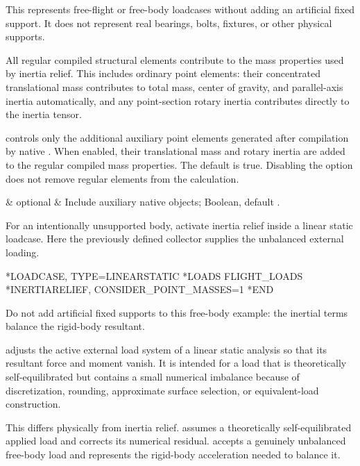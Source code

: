 This represents free-flight or free-body loadcases without adding an artificial fixed support. It does not represent real bearings, bolts, fixtures, or other physical supports.

All regular compiled structural elements contribute to the mass properties used by inertia relief. This includes ordinary  point elements: their concentrated translational mass contributes to total mass, center of gravity, and parallel-axis inertia automatically, and any point-section rotary inertia contributes directly to the inertia tensor.

 controls only the additional auxiliary point elements generated after compilation by native . When enabled, their translational mass and rotary inertia are added to the regular compiled mass properties. The default is true. Disabling the option does not remove regular  elements from the calculation.

\begin{keywordparameters}
 & optional & Include auxiliary native  objects; Boolean, default . \\
\end{keywordparameters}

For an intentionally unsupported body, activate inertia relief
inside a linear static loadcase. Here the previously defined
 collector supplies the unbalanced external loading.

\exampleheading
\begin{inputdeck}
*LOADCASE, TYPE=LINEARSTATIC
*LOADS
FLIGHT_LOADS
*INERTIARELIEF, CONSIDER_POINT_MASSES=1
*END
\end{inputdeck}

Do not add artificial fixed supports to this free-body example:
the inertial terms balance the rigid-body resultant.


 adjusts the active external load system of a linear static analysis so that its resultant force and moment vanish. It is intended for a load that is theoretically self-equilibrated but contains a small numerical imbalance because of discretization, rounding, approximate surface selection, or equivalent-load construction.

This differs physically from inertia relief.  assumes a theoretically self-equilibrated applied load and corrects its numerical residual.  accepts a genuinely unbalanced free-body load and represents the rigid-body acceleration needed to balance it.

